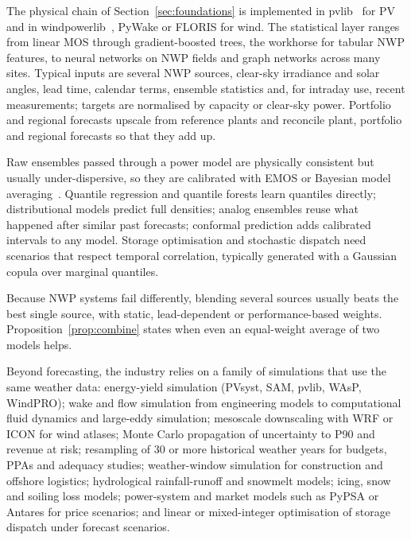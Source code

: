  The physical chain of Section~\ref{sec:foundations} is implemented in pvlib~\cite{holmgren2018pvlib} for PV and in windpowerlib~\cite{windpowerlib}, PyWake or FLORIS for wind. The statistical layer ranges from linear MOS through gradient-boosted trees, the workhorse for tabular NWP features, to neural networks on NWP fields and graph networks across many sites. Typical inputs are several NWP sources, clear-sky irradiance and solar angles, lead time, calendar terms, ensemble statistics and, for intraday use, recent measurements; targets are normalised by capacity or clear-sky power. Portfolio and regional forecasts upscale from reference plants and reconcile plant, portfolio and regional forecasts so that they add up.

 Raw ensembles passed through a power model are physically consistent but usually under-dispersive, so they are calibrated with EMOS or Bayesian model averaging~\cite{gneiting2005emos}. Quantile regression and quantile forests learn quantiles directly; distributional models predict full densities; analog ensembles reuse what happened after similar past forecasts; conformal prediction adds calibrated intervals to any model. Storage optimisation and stochastic dispatch need scenarios that respect temporal correlation, typically generated with a Gaussian copula over marginal quantiles.

 Because NWP systems fail differently, blending several sources usually beats the best single source, with static, lead-dependent or performance-based weights. Proposition~\ref{prop:combine} states when even an equal-weight average of two models helps.

 Beyond forecasting, the industry relies on a family of simulations that use the same weather data: energy-yield simulation (PVsyst, SAM, pvlib, WAsP, WindPRO); wake and flow simulation from engineering models to computational fluid dynamics and large-eddy simulation; mesoscale downscaling with WRF or ICON for wind atlases; Monte Carlo propagation of uncertainty to P90 and revenue at risk; resampling of 30 or more historical weather years for budgets, PPAs and adequacy studies; weather-window simulation for construction and offshore logistics; hydrological rainfall-runoff and snowmelt models; icing, snow and soiling loss models; power-system and market models such as PyPSA or Antares for price scenarios; and linear or mixed-integer optimisation of storage dispatch under forecast scenarios.
